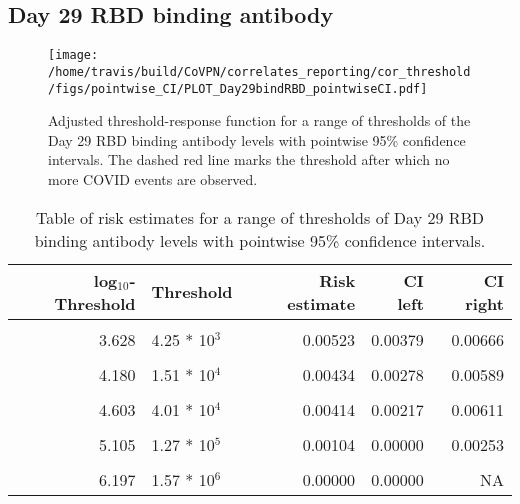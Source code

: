 \documentclass[]{book}
\theoremstyle{definition}
\theoremstyle{definition}
\theoremstyle{definition}
\newcommand{\1}{\mathbbm{1}}
\begin{document}
\newpage

\newpage

\hypertarget{day-29-rbd-binding-antibody}{%
\subsection{Day 29 RBD binding antibody}\label{day-29-rbd-binding-antibody}}

\begin{figure}[H]
\centering
\texttt{[image: /home/travis/build/CoVPN/correlates\_reporting/cor\_threshold/figs/pointwise\_CI/PLOT\_Day29bindRBD\_pointwiseCI.pdf]}
\caption{Adjusted threshold-response function for a range of thresholds of the
  Day 29 RBD binding antibody levels with pointwise 95\% confidence intervals. The dashed red line marks the threshold after which no more COVID events are observed. }
\end{figure}
\begin{table}[!h]

\caption{\label{tab:unnamed-chunk-357}Table of risk estimates for a range of thresholds of Day 29 RBD binding antibody levels with pointwise 95\% confidence intervals.}
\centering
\begin{tabular}[t]{rlrrr}
\toprule
log$_{10}$-Threshold & Threshold & Risk estimate & CI left & CI right\\
\midrule
\cellcolor{gray!6}{2.882} & \cellcolor{gray!6}{7.62 * 10$^2$} & \cellcolor{gray!6}{0.00576} & \cellcolor{gray!6}{0.00435} & \cellcolor{gray!6}{0.00718}\\
3.628 & 4.25 * 10$^3$ & 0.00523 & 0.00379 & 0.00666\\
\cellcolor{gray!6}{3.889} & \cellcolor{gray!6}{7.74 * 10$^3$} & \cellcolor{gray!6}{0.00459} & \cellcolor{gray!6}{0.00316} & \cellcolor{gray!6}{0.00602}\\
4.180 & 1.51 * 10$^4$ & 0.00434 & 0.00278 & 0.00589\\
\cellcolor{gray!6}{4.395} & \cellcolor{gray!6}{2.48 * 10$^4$} & \cellcolor{gray!6}{0.00486} & \cellcolor{gray!6}{0.00298} & \cellcolor{gray!6}{0.00674}\\
4.603 & 4.01 * 10$^4$ & 0.00414 & 0.00217 & 0.00611\\
\cellcolor{gray!6}{4.826} & \cellcolor{gray!6}{6.70 * 10$^4$} & \cellcolor{gray!6}{0.00365} & \cellcolor{gray!6}{0.00148} & \cellcolor{gray!6}{0.00583}\\
5.105 & 1.27 * 10$^5$ & 0.00104 & 0.00000 & 0.00253\\
\cellcolor{gray!6}{5.422} & \cellcolor{gray!6}{2.64 * 10$^5$} & \cellcolor{gray!6}{0.00097} & \cellcolor{gray!6}{0.00000} & \cellcolor{gray!6}{0.00298}\\
6.197 & 1.57 * 10$^6$ & 0.00000 & 0.00000 & NA\\
\bottomrule
\end{tabular}
\end{table}
\end{document}
